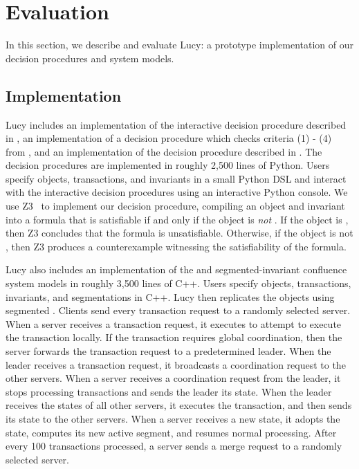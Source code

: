 \section{Evaluation}
In this section, we describe and evaluate Lucy: a prototype implementation of
our decision procedures and system models.

\subsection{Implementation}
Lucy includes an implementation of the interactive decision procedure described
in , an implementation of a decision
procedure which checks criteria (1) - (4) from , and an
implementation of the decision procedure described in
. The decision procedures
are implemented in roughly 2,500 lines of Python. Users specify objects,
transactions, and invariants in a small Python DSL and interact with the
interactive decision procedures using an interactive Python console. We use
Z3~\cite{de2008z3} to implement our \invariantclosure{} decision procedure,
compiling an object and invariant into a formula that is satisfiable if and
only if the object is \emph{not} \invariantclosed{}. If the object is
\invariantclosed{}, then Z3 concludes that the formula is unsatisfiable.
Otherwise, if the object is not \invariantclosed{}, then Z3 produces a
counterexample witnessing the satisfiability of the formula.

Lucy also includes an implementation of the \invariantconfluence{} and
segmented-invariant confluence system models in roughly 3,500 lines of C++.
Users specify objects, transactions, invariants, and segmentations in C++. Lucy
then replicates the objects using segmented \invariantconfluence{}. Clients
send every transaction request to a randomly selected server. When a server
receives a transaction request, it executes  to attempt
to execute the transaction locally.  If the transaction requires global
coordination, then the server forwards the transaction request to a
predetermined leader. When the leader receives a transaction request, it
broadcasts a coordination request to the other servers. When a server receives
a coordination request from the leader, it stops processing transactions and
sends the leader its state. When the leader receives the states of all other
servers, it executes the transaction, and then sends its state to the other
servers. When a server receives a new state, it adopts the state, computes its
new active segment, and resumes normal processing. After every 100 transactions
processed, a server sends a merge request to a randomly selected server.

